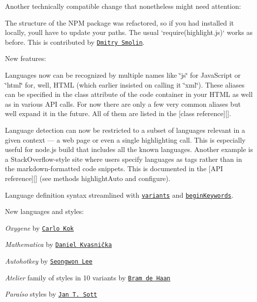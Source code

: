 Another technically compatible change that nonetheless might need attention\+:


\begin{DoxyItemize}
\item The structure of the N\+PM package was refactored, so if you had installed it locally, you\textquotesingle{}ll have to update your paths. The usual `require(\textquotesingle{}highlight.\+js\textquotesingle{})` works as before. This is contributed by \href{https://github.com/dimsmol}{\tt Dmitry Smolin}.
\end{DoxyItemize}

New features\+:


\begin{DoxyItemize}
\item Languages now can be recognized by multiple names like \char`\"{}js\char`\"{} for Java\+Script or \char`\"{}html\char`\"{} for, well, H\+T\+ML (which earlier insisted on calling it \char`\"{}xml\char`\"{}). These aliases can be specified in the class attribute of the code container in your H\+T\+ML as well as in various A\+PI calls. For now there are only a few very common aliases but we\textquotesingle{}ll expand it in the future. All of them are listed in the \mbox{[}class reference\mbox{]}\mbox{[}\mbox{]}.
\item Language detection can now be restricted to a subset of languages relevant in a given context — a web page or even a single highlighting call. This is especially useful for node.\+js build that includes all the known languages. Another example is a Stack\+Overflow-\/style site where users specify languages as tags rather than in the markdown-\/formatted code snippets. This is documented in the \mbox{[}A\+PI reference\mbox{]}\mbox{[}\mbox{]} (see methods {\ttfamily highlight\+Auto} and {\ttfamily configure}).
\item Language definition syntax streamlined with \href{https://groups.google.com/d/topic/highlightjs/VoGC9-1p5vk/discussion}{\tt variants} and \href{https://github.com/isagalaev/highlight.js/commit/6c7fdea002eb3949577a85b3f7930137c7c3038d}{\tt begin\+Keywords}.
\end{DoxyItemize}

New languages and styles\+:


\begin{DoxyItemize}
\item {\itshape Oxygene} by \href{https://github.com/carlokok}{\tt Carlo Kok}
\item {\itshape Mathematica} by \href{https://github.com/dkvasnicka}{\tt Daniel Kvasnička}
\item {\itshape Autohotkey} by \href{https://github.com/dlimpid}{\tt Seongwon Lee}
\item {\itshape Atelier} family of styles in 10 variants by \href{https://github.com/atelierbram}{\tt Bram de Haan}
\item {\itshape Paraíso} styles by \href{https://github.com/idleberg}{\tt Jan T. Sott}
\end{DoxyItemize}

